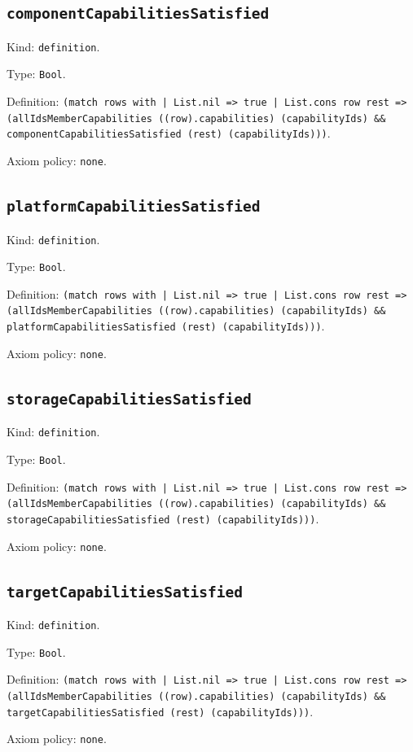 \documentclass[11pt]{article}
\begin{document}
\subsection*{\texttt{componentCapabilitiesSatisfied}}
\noindent Kind: \texttt{definition}.\par
\noindent Type: \texttt{Bool}.\par
\noindent Definition: \texttt{(match rows with | List.nil => true | List.cons row rest => (allIdsMemberCapabilities ((row).capabilities) (capabilityIds) \&\& componentCapabilitiesSatisfied (rest) (capabilityIds)))}.\par
\noindent Axiom policy: \texttt{none}.\par
\subsection*{\texttt{platformCapabilitiesSatisfied}}
\noindent Kind: \texttt{definition}.\par
\noindent Type: \texttt{Bool}.\par
\noindent Definition: \texttt{(match rows with | List.nil => true | List.cons row rest => (allIdsMemberCapabilities ((row).capabilities) (capabilityIds) \&\& platformCapabilitiesSatisfied (rest) (capabilityIds)))}.\par
\noindent Axiom policy: \texttt{none}.\par
\subsection*{\texttt{storageCapabilitiesSatisfied}}
\noindent Kind: \texttt{definition}.\par
\noindent Type: \texttt{Bool}.\par
\noindent Definition: \texttt{(match rows with | List.nil => true | List.cons row rest => (allIdsMemberCapabilities ((row).capabilities) (capabilityIds) \&\& storageCapabilitiesSatisfied (rest) (capabilityIds)))}.\par
\noindent Axiom policy: \texttt{none}.\par
\subsection*{\texttt{targetCapabilitiesSatisfied}}
\noindent Kind: \texttt{definition}.\par
\noindent Type: \texttt{Bool}.\par
\noindent Definition: \texttt{(match rows with | List.nil => true | List.cons row rest => (allIdsMemberCapabilities ((row).capabilities) (capabilityIds) \&\& targetCapabilitiesSatisfied (rest) (capabilityIds)))}.\par
\noindent Axiom policy: \texttt{none}.\par
\end{document}
